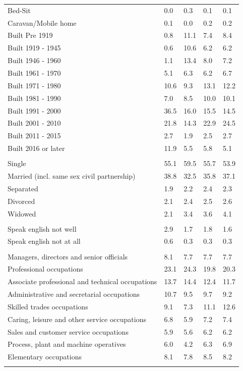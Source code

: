 \documentclass{article}
\begin{document}
\begin{table}[h]
\begin{tabular}{KTTTT}
Bed-Sit & 0.0& 0.3& 0.1& 0.1\\
Caravan/Mobile home & 0.1& 0.0& 0.2& 0.2\\
    \hline
Built Pre 1919 &  0.8& 11.1&  7.4&  8.4\\
Built 1919 - 1945 &  0.6& 10.6&  6.2&  6.2\\
Built  1946 - 1960 &  1.1& 13.4&  8.0&  7.2\\
Built  1961 - 1970 & 5.1& 6.3& 6.2& 6.7\\
Built  1971 - 1980 & 10.6&  9.3& 13.1& 12.2\\
Built  1981 - 1990 &  7.0&  8.5& 10.0& 10.1\\
Built  1991 - 2000 & 36.5& 16.0& 15.5& 14.5\\
Built  2001 - 2010 & 21.8& 14.3& 22.9& 24.5\\
Built  2011 - 2015 & 2.7& 1.9& 2.5& 2.7\\
Built  2016 or later & 11.9&  5.5&  5.8&  5.1\\
\hline
    \\
    \hline
Single & 55.1& 59.5& 55.7& 53.9\\
Married (incl. same sex civil partnership) & 38.8& 32.5& 35.8& 37.1\\
Separated  & 1.9& 2.2& 2.4& 2.3\\
Divorced  & 2.1& 2.4& 2.5& 2.6\\
Widowed & 2.1& 3.4& 3.6& 4.1\\
\hline
    \\ 
    \hline
Speak english not well & 2.9& 1.7& 1.8& 1.6\\
Speak english not at all & 0.6& 0.3& 0.3& 0.3\\
\hline
    \\
    \hline
Managers, directors and senior officials & 8.1& 7.7& 7.7& 7.7\\
Professional occupations & 23.1& 24.3& 19.8& 20.3\\
Associate professional and technical occupations & 13.7& 14.4& 12.4& 11.7\\
Administrative and secretarial occupations & 10.7&  9.5&  9.7&  9.2\\
Skilled trades occupations &  9.1&  7.3& 11.1& 12.6\\
Caring, leisure and other service occupations & 6.8& 5.9& 7.2& 7.4\\
Sales and customer service occupations & 5.9& 5.6& 6.2& 6.2\\
Process, plant and machine operatives & 6.0& 4.2& 6.3& 6.9\\
Elementary occupations & 8.1& 7.8& 8.5& 8.2\\
\hline
\end{tabular}
\end{table}
\end{document}
